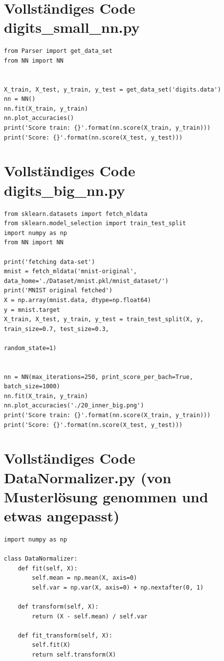 \section*{Vollständiges Code digits\_small\_nn.py}

\begin{lstlisting}[style=py]
from Parser import get_data_set
from NN import NN


X_train, X_test, y_train, y_test = get_data_set('digits.data')
nn = NN()
nn.fit(X_train, y_train)
nn.plot_accuracies()
print('Score train: {}'.format(nn.score(X_train, y_train)))
print('Score: {}'.format(nn.score(X_test, y_test)))

\end{lstlisting}

\section*{Vollständiges Code digits\_big\_nn.py}

\begin{lstlisting}[style=py]
from sklearn.datasets import fetch_mldata
from sklearn.model_selection import train_test_split
import numpy as np
from NN import NN

print('fetching data-set')
mnist = fetch_mldata('mnist-original', data_home='./Dataset/mnist.pkl/mnist_dataset/')
print('MNIST original fetched')
X = np.array(mnist.data, dtype=np.float64)
y = mnist.target
X_train, X_test, y_train, y_test = train_test_split(X, y, train_size=0.7, test_size=0.3,
                                                        random_state=1)


nn = NN(max_iterations=250, print_score_per_bach=True, batch_size=1000)
nn.fit(X_train, y_train)
nn.plot_accuracies('./20_inner_big.png')
print('Score train: {}'.format(nn.score(X_train, y_train)))
print('Score: {}'.format(nn.score(X_test, y_test)))

\end{lstlisting}

\section*{Vollständiges Code DataNormalizer.py (von Musterlösung genommen und etwas angepasst)}

\begin{lstlisting}[style=py]
import numpy as np

class DataNormalizer:
    def fit(self, X):
        self.mean = np.mean(X, axis=0)
        self.var = np.var(X, axis=0) + np.nextafter(0, 1)

    def transform(self, X):
        return (X - self.mean) / self.var

    def fit_transform(self, X):
        self.fit(X)
        return self.transform(X)
\end{lstlisting}

